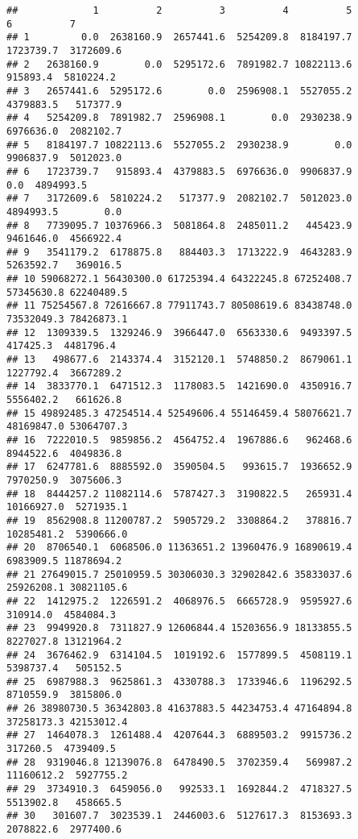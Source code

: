\documentclass[
]{article}
\begin{document}
\begin{verbatim}
##             1          2          3          4          5          6          7
## 1         0.0  2638160.9  2657441.6  5254209.8  8184197.7  1723739.7  3172609.6
## 2   2638160.9        0.0  5295172.6  7891982.7 10822113.6   915893.4  5810224.2
## 3   2657441.6  5295172.6        0.0  2596908.1  5527055.2  4379883.5   517377.9
## 4   5254209.8  7891982.7  2596908.1        0.0  2930238.9  6976636.0  2082102.7
## 5   8184197.7 10822113.6  5527055.2  2930238.9        0.0  9906837.9  5012023.0
## 6   1723739.7   915893.4  4379883.5  6976636.0  9906837.9        0.0  4894993.5
## 7   3172609.6  5810224.2   517377.9  2082102.7  5012023.0  4894993.5        0.0
## 8   7739095.7 10376966.3  5081864.8  2485011.2   445423.9  9461646.0  4566922.4
## 9   3541179.2  6178875.8   884403.3  1713222.9  4643283.9  5263592.7   369016.5
## 10 59068272.1 56430300.0 61725394.4 64322245.8 67252408.7 57345630.8 62240489.5
## 11 75254567.8 72616667.8 77911743.7 80508619.6 83438748.0 73532049.3 78426873.1
## 12  1309339.5  1329246.9  3966447.0  6563330.6  9493397.5   417425.3  4481796.4
## 13   498677.6  2143374.4  3152120.1  5748850.2  8679061.1  1227792.4  3667289.2
## 14  3833770.1  6471512.3  1178083.5  1421690.0  4350916.7  5556402.2   661626.8
## 15 49892485.3 47254514.4 52549606.4 55146459.4 58076621.7 48169847.0 53064707.3
## 16  7222010.5  9859856.2  4564752.4  1967886.6   962468.6  8944522.6  4049836.8
## 17  6247781.6  8885592.0  3590504.5   993615.7  1936652.9  7970250.9  3075606.3
## 18  8444257.2 11082114.6  5787427.3  3190822.5   265931.4 10166927.0  5271935.1
## 19  8562908.8 11200787.2  5905729.2  3308864.2   378816.7 10285481.2  5390666.0
## 20  8706540.1  6068506.0 11363651.2 13960476.9 16890619.4  6983909.5 11878694.2
## 21 27649015.7 25010959.5 30306030.3 32902842.6 35833037.6 25926208.1 30821105.6
## 22  1412975.2  1226591.2  4068976.5  6665728.9  9595927.6   310914.0  4584084.3
## 23  9949920.8  7311827.9 12606844.4 15203656.9 18133855.5  8227027.8 13121964.2
## 24  3676462.9  6314104.5  1019192.6  1577899.5  4508119.1  5398737.4   505152.5
## 25  6987988.3  9625861.3  4330788.3  1733946.6  1196292.5  8710559.9  3815806.0
## 26 38980730.5 36342803.8 41637883.5 44234753.4 47164894.8 37258173.3 42153012.4
## 27  1464078.3  1261488.4  4207644.3  6889503.2  9915736.2   317260.5  4739409.5
## 28  9319046.8 12139076.8  6478490.5  3702359.4   569987.2 11160612.2  5927755.2
## 29  3734910.3  6459056.0   992533.1  1692844.2  4718327.5  5513902.8   458665.5
## 30   301607.7  3023539.1  2446003.6  5127617.3  8153693.3  2078822.6  2977400.6

\end{verbatim}
\end{document}
